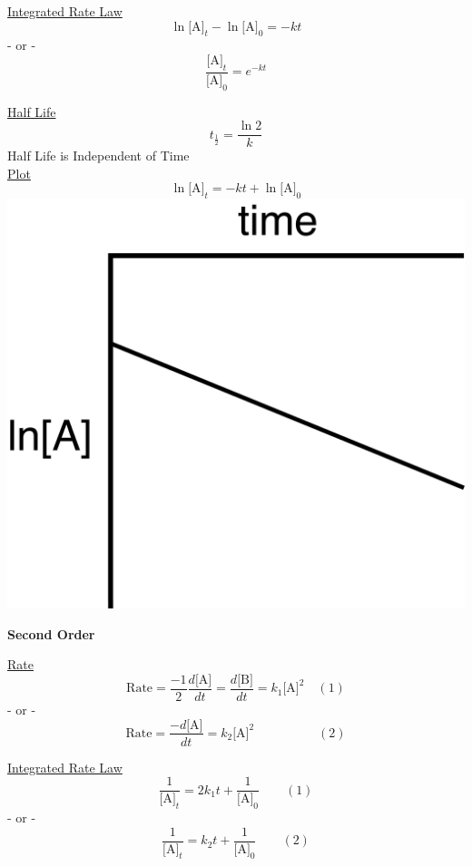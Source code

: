 \documentclass{article}
\begin{document}
\begin{center}
\begin{multicols}{3}
    \underline{Integrated Rate Law}
    \[
        \ln{\textrm{[A]}_t} - \ln{\textrm{[A]}_0} = -kt
    \]
    - or -
    \[
        \frac{\textrm{[A]}_t}{\textrm{[A]}_0} = e^{-kt}
    \]
    
    \underline{Half Life}
    \[
        t_{\frac{1}{2}} = \frac{\ln{2}}{k}
    \]
    \footnotesize
    Half Life is Independent of Time
    \normalsize\\
    \medskip
    \underline{Plot}
    \[
        \ln{\textrm{[A]}_t} = -kt + \ln{\textrm{[A]}_0}
    \]
    \includegraphics[scale =0.25]{secondorder.png}
    
\vfill\null\columnbreak

    \large
    \textbf{Second Order}
    \normalsize
    \medskip
    
    \underline{Rate}
    \[
        \textrm{Rate} = \frac{-1}{2}\frac{d\textrm{[A]}}{dt} = \frac{d\textrm{[B]}}{dt} = k_1\textrm{[A]}^2 \quad (1)
    \]
    - or -
    \[
        \textrm{Rate} = \frac{-d\textrm{[A]}}{dt} = k_2\textrm{[A]}^2 \qquad \qquad \quad (2)
    \]
    
    \underline{Integrated Rate Law}
    \[
        \frac{1}{\textrm{[A]}_t} = 2k_1t + \frac{1}{\textrm{[A]}_0} \qquad (1)
    \]
    - or -
    \[
        \frac{1}{\textrm{[A]}_t} = k_2t + \frac{1}{\textrm{[A]}_0} \qquad (2)
    \]
    

\end{multicols}
\end{center}
\end{document}
